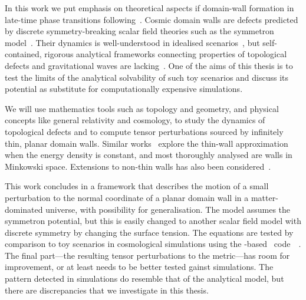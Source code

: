 In this work we put emphasis on theoretical aspects if domain-wall formation in late-time phase transitions following~\citet{christiansenGravitationalWavesDark2024,christiansenAsimulationDomainFormation2024}. Cosmic domain walls are defects predicted by discrete symmetry-breaking scalar field theories such as the symmetron model~\citep{hinterbichlerSymmetronCosmology2011}. Their dynamics is well-understood in idealised scenarios~\citep{vachaspatiKinksDomainWalls2006,blanco-pilladoDynamicsDomainWall2023,guvenPerturbationsTopologicalDefect1993,garrigaPerturbationsDomainWalls1991,ishibashiEquationMotionDomain1999}, but self-contained, rigorous analytical frameworks connecting properties of topological defects and gravitational waves are lacking~\citep{saikawaReviewGravitationalWaves2017}. One of the aims of this thesis is to test the limits of the analytical solvability of such toy scenarios and discuss its potential as substitute for computationally expensive simulations. 











We will use mathematics tools such as topology and geometry, and physical concepts like general relativity and cosmology, to study the dynamics of topological defects and to compute tensor perturbations sourced by infinitely thin, planar domain walls. 
Similar works~\cite{blanco-pilladoDynamicsDomainWall2023,ishibashiEquationMotionDomain1999,garrigaPerturbationsDomainWalls1991} explore the thin-wall approximation when the energy density is constant, and most thoroughly analysed are walls in Minkowski space. Extensions to non-thin walls has also been considered~\citep{cuttingGravitationalWavesVacuum2021}. %


This work concludes in a framework that describes the motion of a small perturbation to the normal coordinate of a planar domain wall in a matter-dominated universe, with possibility for generalisation. The model assumes the symmetron potential, but this is easily changed to another scalar field model with discrete symmetry by changing the surface tension. The equations are tested by comparison to toy scenarios in cosmological simulations using the \gevolution-based~\citep{adamekGeneralRelativityCosmic2016} code~\asgrd~\citep{christiansenGravitationalWavesDark2024}. 
The final part---the resulting tensor perturbations to the metric---has room for improvement, or at least needs to be better tested gainst simulations. The pattern detected in simulations do resemble that of the analytical model, but there are discrepancies that we investigate in this thesis.



